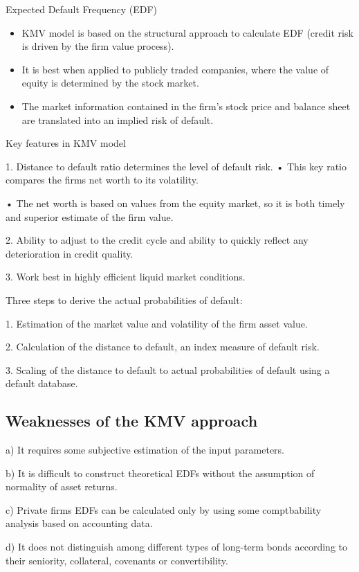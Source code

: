 Expected Default Frequency (EDF)

\begin{itemize}
\item KMV model is based on the structural approach to calculate EDF (credit risk is driven by the ﬁrm value process).
\item It is best when applied to publicly traded companies, where the value of equity is determined by the stock market.
\item 
The market information contained in the ﬁrm's stock price and balance sheet are translated into an implied risk of default.
\end{itemize}


Key features in KMV model


1. Distance to default ratio determines the level of default risk.
•
This key ratio compares the ﬁrms net worth to its volatility.

•
The net worth is based on values from the equity market, so it is both timely and superior estimate of the ﬁrm value.


2. Ability to adjust to the credit cycle and ability to quickly reﬂect any deterioration in credit quality.

3. Work best in highly eﬃcient liquid market conditions.


Three steps to derive the actual probabilities of default:

1. Estimation of the market value and volatility of the ﬁrm asset value.

2. Calculation of the distance to default, an index measure of default risk.

3. Scaling of the distance to default to actual probabilities of default using a default database.


\subsection{Weaknesses of the KMV approach}

a) It requires some subjective estimation of the input parameters.

b) It is difficult to construct theoretical EDFs without the assumption of normality of asset returns.

c) Private ﬁrms EDFs can be calculated only by using some comptbability analysis based on accounting data.

d) It does not distinguish among different types of long-term bonds according to their seniority, collateral, covenants or convertibility.


